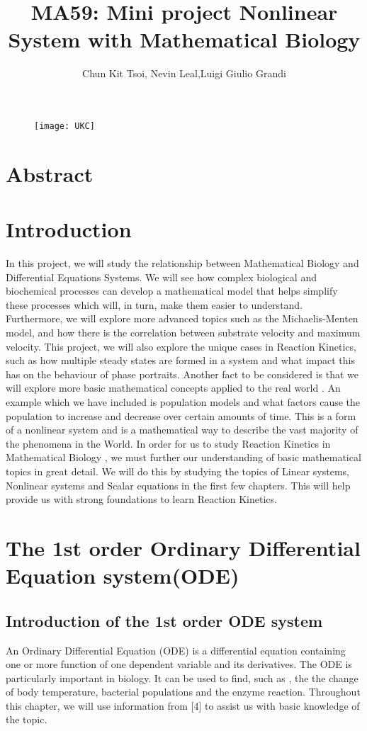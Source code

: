 \documentclass[a4paper]{report}
\title{MA59: Mini project Nonlinear System with Mathematical Biology}
\author{Chun Kit Tsoi, Nevin Leal,Luigi Giulio Grandi}
\theoremstyle{definition}
\begin{document}
\begin{figure}[b]
\texttt{[image: UKC]}
\label{fig:lgfigure}
\end{figure} 
\maketitle

\tableofcontents


\chapter{Abstract}
\chapter{Introduction}
In this project, we will study the relationship between Mathematical Biology and Differential Equations Systems. We will see how complex biological and biochemical processes can develop a mathematical model that helps simplify these processes which will, in turn, make them easier to understand.  Furthermore, we will explore more advanced topics such as the Michaelis-Menten model,  and how there is the correlation between substrate velocity and maximum velocity.  This project, we will also explore the unique cases in Reaction Kinetics, such as how multiple steady states are formed in a system and what impact this has on the behaviour of phase portraits. Another fact to be considered is that we will explore more basic mathematical concepts applied to the real world . An example which we have included is population models and what factors cause the population to increase and decrease over certain amounts of time. This is a form of a nonlinear system and is a mathematical way to describe the vast majority of the phenomena in the World.
In order for us to study  Reaction Kinetics in Mathematical Biology , we must further our understanding of basic mathematical topics in great detail. We will do this by studying the topics of  Linear systems, Nonlinear systems and Scalar equations in the first few chapters.  This will help provide us with strong foundations to learn Reaction Kinetics.

\chapter{The 1st order Ordinary Differential Equation system(ODE)}
\section{Introduction of the 1st order ODE system}
\medskip
An Ordinary Differential Equation (ODE) is a differential equation containing one or more function of one dependent variable and its  derivatives.
The ODE is particularly important in biology.  It can be used to find, such as , the the change of body temperature, bacterial populations and the enzyme reaction. Throughout this chapter, we will use information from [4] to assist us with basic knowledge of the topic. 
\end{document}
